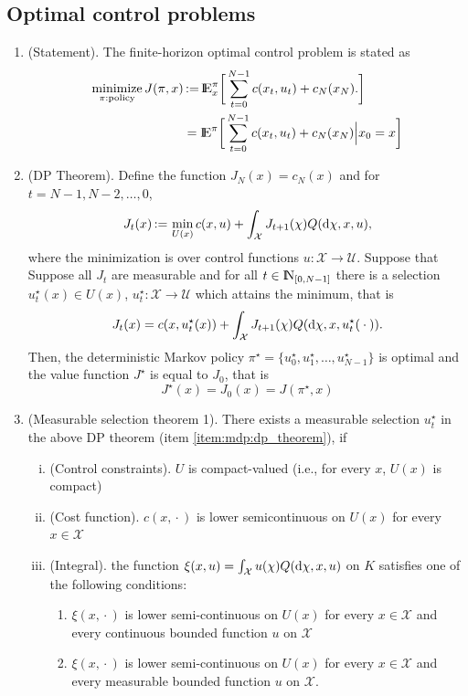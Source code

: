 \documentclass[a4paper,10pt]{scrbook}
\begin{document}
\subsection{Optimal control problems}
\begin{enumerate}
 \item (Statement). The finite-horizon optimal control problem is stated as 
 \begin{align*}
  \minimize_{\pi: \text{policy}} J(\pi,x) &\dfn \E_x^\pi\bigg[
    \sum_{t=0}^{N-1}c(x_t, u_t) + c_N(x_N).
  \bigg]\\
  &=\E^\pi\bigg[
    \sum_{t=0}^{N-1}c(x_t, u_t) + c_N(x_N) {}\Big|{} x_0 = x
  \bigg]
 \end{align*}
 \item \label{item:mdp:dp_theorem}(DP Theorem). Define the function $J_N(x) = c_N(x)$ and for $t=N-1,N-2,\ldots, 0$, 
 \[
  J_t(x) {}\mathop{\mathrel{:}=}{} \min_{U(x)} 
      c(x,u) + \int_{\mathcal{X}}J_{t+1}(\chi)Q(\mathrm{d}\chi, x, u),
 \]
 where the minimization is over control functions \(u:\mathcal{X}\to\mathcal{U}\). Suppose that 
Suppose all \(J_t\) are measurable and for all \(t\in\N_{[0,N-1]}\) there 
 is a selection \(u_t^\star(x)\in U(x)\), \(u_t^\star: \mathcal{X}\to\mathcal{U}\) which attains the minimum, that is
 \[
  J_t(x) = c(x,u_t^\star(x)) + \int_{\mathcal{X}}J_{t+1}(\chi)Q(\mathrm{d}\chi, x, u_t^\star({}\cdot{})).
 \]
 Then, the deterministic Markov policy \(\pi^\star=\{u_0^\star, u_1^\star, \ldots, u_{N-1}^\star\}\)
 is optimal and the value function \(J^\star\) is equal to \(J_0\), that is
 \[
  J^\star(x) = J_0(x) = J(\pi^\star, x)
 \]
 \item (Measurable selection theorem 1). There exists a measurable selection \(u_t^\star\) 
       in the above DP theorem (item \ref{item:mdp:dp_theorem}), if 
       \begin{enumerate}[i.]
        \item (Control constraints). \(U\) is compact-valued (i.e., for every \(x\), \(U(x)\) is compact)
        \item (Cost function). \(c(x, {}\cdot{})\) is lower semicontinuous on \(U(x)\) for every \(x\in\mathcal{X}\)
        \item (Integral). the function \(\xi(x, u) = \int_{\mathcal{X}} u(\chi) Q(\mathrm{d} \chi, x, u)\) on \(K\) satisfies 
              one of the following conditions:
              \begin{enumerate}
               \item \(\xi(x, {}\cdot{})\) is lower semi-continuous on \(U(x)\) for every \(x\in \mathcal{X}\) and every 
                      continuous bounded function \(u\) on \(\mathcal{X}\)
               \item \(\xi(x, {}\cdot{})\) is lower semi-continuous on \(U(x)\) for every \(x\in \mathcal{X}\) and every 
                      measurable bounded function \(u\) on \(\mathcal{X}\).
              \end{enumerate}
       \end{enumerate}


\end{enumerate}
\end{document}
